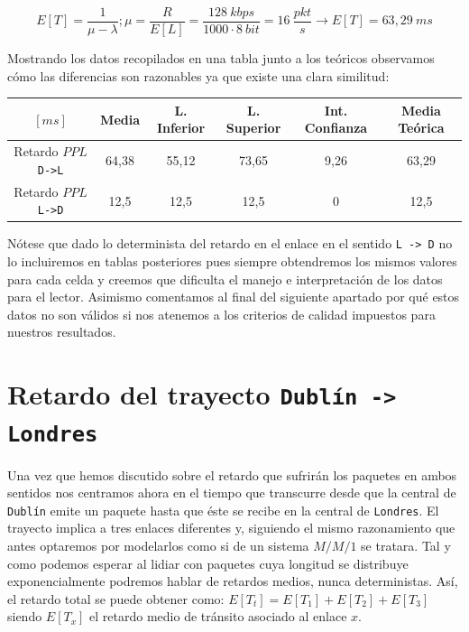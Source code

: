 \documentclass{article}[10pt]
\begin{document}
		$$E[T] = \frac{1}{\mu - \lambda}; \mu = \frac{R}{E[L]} = \frac{128\ kbps}{1000 \cdot 8\ bit} = 16\ \frac{pkt}{s} \rightarrow E[T] = 63,29\ ms$$

		Mostrando los datos recopilados en una tabla junto a los teóricos observamos cómo las diferencias son razonables ya que existe una clara similitud:

		\vskip 3mm

		\begin{center}
			\begin{tabular}{| c | c | c | c | c | c |}
				\hline
				$[ms]$ & Media & L. Inferior & L. Superior & Int. Confianza & Media Teórica\\
				\hline
				Retardo $PPL$ \texttt{D->L} & 64,38 & 55,12 & 73,65 & 9,26 & 63,29\\
				\hline
				Retardo $PPL$ \texttt{L->D} & 12,5 & 12,5 & 12,5 & 0 & 12,5\\
				\hline
			\end{tabular}
		\end{center}

		\vskip 3mm

		Nótese que dado lo determinista del retardo en el enlace en el sentido \texttt{L -> D} no lo incluiremos en tablas posteriores pues siempre obtendremos los mismos valores para cada celda y creemos que dificulta el manejo e interpretación de los datos para el lector. Asimismo comentamos al final del siguiente apartado por qué estos datos no son válidos si nos atenemos a los criterios de calidad impuestos para nuestros resultados.

	\section{Retardo del trayecto \texttt{Dublín -> Londres}}
		Una vez que hemos discutido sobre el retardo que sufrirán los paquetes en ambos sentidos nos centramos ahora en el tiempo que transcurre desde que la central de \texttt{Dublín} emite un paquete hasta que éste se recibe en la central de \texttt{Londres}. El trayecto implica a tres enlaces diferentes y, siguiendo el mismo razonamiento que antes optaremos por modelarlos como si de un sistema $M/M/1$ se tratara. Tal y como podemos esperar al lidiar con paquetes cuya longitud se distribuye exponencialmente podremos hablar de retardos medios, nunca deterministas. Así, el retardo total se puede obtener como: $E[T_t] = E[T_1] + E[T_2] + E[T_3]$ siendo $E[T_x]$ el retardo medio de tránsito asociado al enlace $x$.
\end{document}
